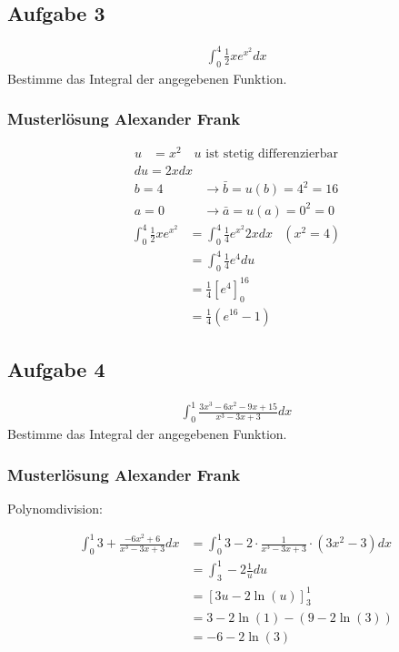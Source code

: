 \subsection{Aufgabe 3}
\begin{align*}
    \int_0^4 \frac{1}{2} x e^{x^2} dx
\end{align*}
Bestimme das Integral der angegebenen Funktion.

\subsubsection{Musterlösung Alexander Frank}
\begin{align*}
    u &= x^2 \quad u\text{ ist stetig differenzierbar}
\end{align*}
\begin{align*}
    du = 2x dx\\
    b = 4 &\rightarrow \bar b = u(b) = 4^2 = 16\\
    a = 0 &\rightarrow \bar a = u(a) = 0^2 = 0
\end{align*}
\begin{align*}
    \int_0^4 \frac{1}{2}xe^{x^2} &= \int_0^4 \frac{1}{4} e^{x^2} 2x dx & (x^2 = 4)\\
    &= \int_0^4 \frac{1}{4} e^4 du \\
    &= \frac{1}{4} \left[e^4\right]_0^{16}\\
    &= \frac{1}{4} \left(e^16 - 1\right)
\end{align*}

\subsection{Aufgabe 4}
\begin{align*}
    \int_0^1 \frac{3x^3 - 6x^2 - 9x + 15}{x^3 - 3x + 3} dx
\end{align*}
Bestimme das Integral der angegebenen Funktion.


\subsubsection{Musterlösung Alexander Frank}
Polynomdivision:

\begin{align*}
    \int_0^1 3 + \frac{-6x^2 + 6}{x^3 - 3x + 3} dx&= \int_0^1 3 - 2 \cdot \frac{1}{x^3 - 3x + 3} \cdot (3x^2 - 3) dx\\
    &= \int_3^1 - 2 \frac{1}{u} du\\
    &= \left[3 u - 2\ln(u)\right]_3^1\\
    &= 3 - 2 \ln(1) - (9 - 2\ln (3))\\
    &= -6 - 2 \ln(3)
\end{align*}